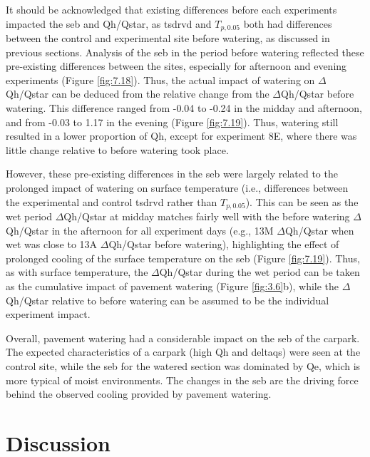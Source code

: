 \documentclass[final,3p,times,authoryear]{elsarticle}
\begin{document}
It should be acknowledged that existing differences before each experiments impacted
the \gls{seb} and \gls{Qh}/\gls{Qstar}, as \gls{tsdrvd} and $T_{p,0.05}$ both had differences between the control and experimental site before watering, as discussed in previous sections. Analysis of the \gls{seb} in the period before watering reflected these pre-existing differences between the sites, especially for afternoon and evening experiments (Figure \ref{fig:7.18}). Thus, the actual impact of watering on $\Delta$\gls{Qh}/\gls{Qstar} can be deduced from the relative change from the $\Delta$\gls{Qh}/\gls{Qstar} before watering. This difference ranged from -0.04 to -0.24 in the midday and afternoon, and from -0.03 to 1.17 in the evening (Figure \ref{fig:7.19}). Thus, watering still resulted in a lower proportion of \gls{Qh}, except for experiment 8E, where there was little change relative to before watering took place.

However, these pre-existing differences in the \gls{seb} were largely related to the prolonged impact of watering on surface temperature (i.e., differences between the experimental and control \gls{tsdrvd} rather than $T_{p,0.05}$). This can be seen as the wet period $\Delta$\gls{Qh}/\gls{Qstar} at midday matches fairly well with the before watering $\Delta$\gls{Qh}/\gls{Qstar} in the afternoon for all experiment days (e.g., 13M $\Delta$\gls{Qh}/\gls{Qstar} when wet was close to 13A $\Delta$\gls{Qh}/\gls{Qstar} before watering), highlighting the effect of prolonged cooling of the surface temperature on the \gls{seb} (Figure \ref{fig:7.19}). Thus, as with surface temperature, the $\Delta$\gls{Qh}/\gls{Qstar} during the wet period can be taken as the cumulative impact of pavement watering (Figure \ref{fig:3.6}b), while the $\Delta$\gls{Qh}/\gls{Qstar} relative to before watering can be assumed to be the individual experiment impact.

Overall, pavement watering had a considerable impact on the \gls{seb} of the carpark. The expected characteristics of a carpark (high \gls{Qh} and \gls{deltaqs}) were seen at the control site, while the \gls{seb} for the watered section was dominated by \gls{Qe}, which is more typical of moist environments. The changes in the \gls{seb} are the driving force behind the observed cooling provided by pavement watering.

\section{Discussion}\label{sec:discussion}
 
\end{document}

